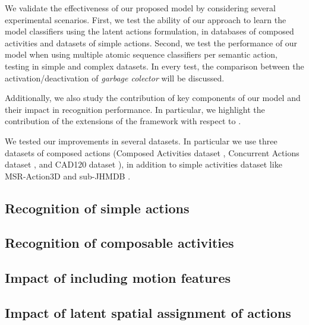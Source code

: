 We validate the effectiveness of our proposed model by considering several experimental scenarios.
First, we test the ability of our approach to learn the model classifiers using the latent actions formulation, in databases of composed activities and datasets of simple actions. 
Second, we test the performance of our model when using multiple atomic sequence  classifiers per semantic action, testing in  simple and complex datasets. In every test, the comparison between the activation/deactivation of \emph{garbage colector} will be discussed.

Additionally, we also study the contribution of key components of our model
and their impact in recognition performance.
In particular, we highlight the contribution of the extensions of the
framework with respect to \cite{Lillo2014}.

We tested our improvements in several datasets. In particular we use three datasets of composed actions (Composed Activities dataset \cite{Lillo2014}, Concurrent Actions dataset \cite{Wei2013}, and CAD120 dataset \cite{Koppula2012}), in addition to simple activities dataset like MSR-Action3D \cite{WanLi2010} and sub-JHMDB \cite{Jhuang2013}.

\subsection{Recognition of simple actions}
\label{subsec:exp_setup}

%

\subsection{Recognition of composable activities}
\label{subsec:experiments_summary}
%

\subsection{Impact of including motion features}
\label{subsec:exp_vlatent}

\subsection{Impact of latent spatial assignment of actions}
\label{subsec:exp_vlatent}
%

